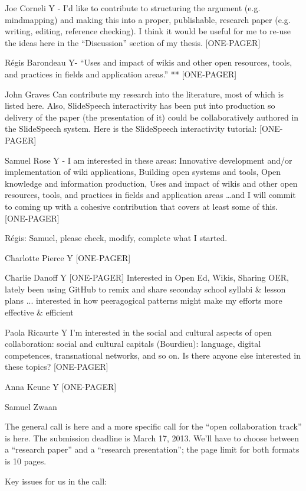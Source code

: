 \documentclass{acm_proc_article-sp}
\begin{document}
    Joe Corneli Y - I'd like to contribute to structuring the argument (e.g. mindmapping) and making this into a proper, publishable, research paper (e.g. writing, editing, reference checking). I think it would be useful for me to re-use the ideas here in the ``Discussion'' section of my thesis. [ONE-PAGER]

    R\'egis Barondeau Y- ``Uses and impact of wikis and other open resources, tools, and practices in fields and application areas.'' ** [ONE-PAGER]

    John Graves Can contribute my research into the literature, most of which is listed here. Also, SlideSpeech interactivity has been put into production so delivery of the paper (the presentation of it) could be collaboratively authored in the SlideSpeech system. Here is the SlideSpeech interactivity tutorial: [ONE-PAGER]

    Samuel Rose Y - I am interested in these areas: Innovative development and/or implementation of wiki applications, Building open systems and tools, Open knowledge and information production, Uses and impact of wikis and other open resources, tools, and practices in fields and application areas \ldots and I will commit to coming up with a cohesive contribution that covers at least some of this. [ONE-PAGER]

        R\'egis: Samuel, please check, modify, complete what I started. 

    Charlotte Pierce Y [ONE-PAGER]

    Charlie Danoff Y [ONE-PAGER] Interested in Open Ed, Wikis, Sharing OER, lately been using GitHub to remix and share seconday school syllabi \& lesson plans ... interested in how peeragogical patterns might make my efforts more effective \& efficient

    Paola Ricaurte Y I'm interested in the social and cultural aspects of open collaboration: social and cultural capitals (Bourdieu): language, digital competences, transnational networks, and so on. Is there anyone else interested in these topics? [ONE-PAGER]

    Anna Keune Y [ONE-PAGER]

    Samuel Zwaan 


The general call is here and a more specific call for the ``open collaboration track'' is here. The submission deadline is March 17, 2013. We'll have to choose between a ``research paper'' and a ``research presentation''; the page limit for both formats is 10 pages.

Key issues for us in the call:
\end{document}
